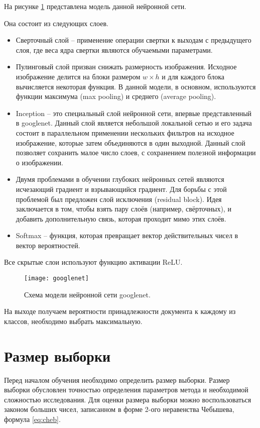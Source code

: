 На рисунке \ref{img:googlenet} представлена модель данной нейронной сети.

Она состоит из следующих слоев.
\begin{itemize}
\item Сверточный слой -- применение операции свертки к выходам с предыдущего слоя, где веса ядра свертки являются обучаемыми параметрами. 
\item Пулинговый слой призван снижать размерность изображения. Исходное изображение делится на блоки размером $w \times h$ и для каждого блока вычисляется некоторая функция. В данной модели, в основном, используются функции максимума (max pooling) и среднего (average pooling). 
\item  Inception -- это специальный слой нейронной сети, впервые представленный в googlenet. Данный слой является небольшой локальной сетью и его задача состоит в параллельном применении нескольких фильтров на исходное изображение, которые затем объединяются в один выходной. Данный слой позволяет сохранить малое число слоев, с сохранением полезной информации о изображении.
\item  Двумя проблемами в обучении глубоких нейронных сетей являются исчезающий градиент и взрывающийся градиент. Для борьбы с этой проблемой был предложен слой исключения (residual block). Идея заключается в том, чтобы взять пару слоёв (например, свёрточных), и добавить дополнительную связь, которая проходит мимо этих слоёв. 
\item  Softmax -- функция, которая превращает вектор действительных чисел в вектор вероятностей. 
\end{itemize}

Все скрытые слои используют функцию активации ReLU.
 
\begin{figure}[H]
	\centering
	\texttt{[image: googlenet]}
	\caption{Схема модели нейронной сети googlenet. }
	\label{img:googlenet}
\end{figure}

На выходе получаем вероятности принадлежности документа к каждому из классов, необходимо выбрать максимальную.

\section{Размер выборки}

Перед началом обучения необходимо определить размер выборки. Размер выборки обусловлен точностью определения параметров метода и необходимой сложностью исследования. Для оценки размера выборки можно воспользоваться законом больших чисел, записанном в форме 2-ого неравенства Чебышева, формула
 \ref{eq:cheb}. \cite{cheb}

